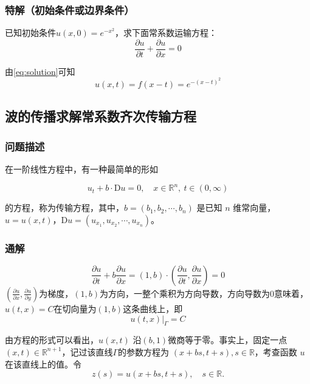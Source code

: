 \documentclass[12pt,a4paper]{article}
\numberwithin{subsection}{section}   %
\numberwithin{subsubsection}{subsection}
\theoremstyle{plain}
\theoremstyle{definition}
\theoremstyle{remark}
\theoremstyle{remark}
\begin{document}
		\subsubsection{特解（初始条件或边界条件）} 
	已知初始条件$	u(x, 0) = e^{-x^2}$，求下面常系数运输方程：
	\begin{equation} 
		\frac{\partial u}{\partial t} +  \frac{\partial u}{\partial x} = 0
	\end{equation}
	
	由\eqref{eq:solution}可知
	\begin{equation}
		u(x, t) = f(x - t)= e^{-(x-t)^2}
	\end{equation}
	
	
	\subsection{波的传播求解常系数齐次传输方程} 
	\subsubsection{问题描述}
	在一阶线性方程中，有一种最简单的形如
	
	\begin{equation}
		u_t + b \cdot \mathrm{D}u = 0, \quad x \in \mathbb{R}^n, \ t \in (0, \infty)
	\end{equation}
	
	的方程，称为传输方程，其中，\(b = (b_1, b_2, \cdots, b_n)\) 是已知 \(n\) 维常向量，\(u = u(x, t)\)，\(\mathrm{D}u = (u_{x_1}, u_{x_2}, \cdots, u_{x_n})\)。
	
		\subsubsection{通解} 
			\begin{equation}
			\frac{\partial u}{\partial t} + b \frac{\partial u}{\partial x}=(1, b) \cdot \left( \frac{\partial u}{\partial t}, \frac{\partial u}{\partial x} \right) = 0 
		\end{equation}
		$\left( \frac{\partial u}{\partial x}, \frac{\partial u}{\partial y} \right)$为梯度，$(1, b)$为方向，一整个乘积为方向导数，方向导数为0意味着，$u(t, x)=C$在切向量为$(1, b)$这条曲线上，即
		\begin{equation}
			u(t,x)|_{\Gamma} = C
		\end{equation}
		
	
	由方程的形式可以看出，\(u(x, t)\) 沿$(b, 1)$微商等于零。事实上，固定一点 \((x, t) \in \mathbb{R}^{n+1}\)，记过该直线$\Gamma$的参数方程为 \((x + bs, t + s), s \in \mathbb{R}\)，考查函数 \(u\) 在该直线上的值。令
\begin{equation}
	z(s) = u(x + bs, t + s), \quad s \in \mathbb{R}.
	\end{equation}
	
\end{document}
